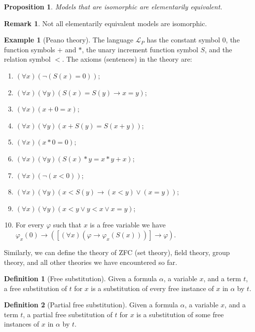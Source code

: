 \documentclass[11pt,a4paper]{article}
\theoremstyle{definition}
\newtheorem{definition}{Definition}[section]
\newtheorem{remark}{Remark}[section]
\newtheorem{example}{Example}[section]
\theoremstyle{plain}
\newtheorem{proposition}[theorem]{Proposition}
\renewcommand{\L}{\mathcal{L}}
\renewcommand{\implies}{\rightarrow}
\begin{document}
  \begin{proposition}
    Models that are isomorphic are elementarily equivalent.
  \end{proposition}
  \begin{remark}
    Not all elementarily equivalent models are isomorphic.
  \end{remark}

  \begin{example}[Peano theory]
    The language $\L_P$ has the constant symbol $0$, the function symbols
    $+$ and $*$, the unary increment function symbol $S$, and the relation
    symbol $<$. The axioms (sentences) in the theory are:
    \begin{enumerate}
      \item [(1)] $(\forall x)(\neg (S(x) = 0))$;
      \item [(2)] $(\forall x)(\forall y)(S(x) = S(y) \implies x =y)$;
      \item [(3)] $(\forall x)(x + 0 = x)$;
      \item [(4)] $(\forall x)(\forall y)(x + S(y) = S(x + y))$;
      \item [(5)] $(\forall x)(x * 0 = 0)$;
      \item [(6)] $(\forall x)(\forall y)(S(x) * y = x * y + x)$;
      \item [(7)] $(\forall x)(\neg (x < 0))$;
      \item [(8)] $(\forall x)(\forall y)
        (x < S(y) \implies (x < y) \lor (x=y))$;
      \item [(9)] $(\forall x)(\forall y)(x < y \lor y < x \lor x = y)$;
      \item [(10)] For every $\varphi$ such that $x$ is a free variable 
        we have $\varphi_x(0) \implies \left(\left[(\forall x)
        (\varphi \implies \varphi_x(S(x)))\right] \implies \varphi \right)$.
    \end{enumerate}
  \end{example}

  Similarly, we can define the theory of ZFC (set theory), field theory,
  group theory, and all other theories we have encountered so far.

  \begin{definition}[Free substitution]
    Given a formula $\alpha$, a variable $x$, and a term $t$,
    a free substitution of $t$ for $x$ is a substitution of every
    free instance of $x$ in $\alpha$ by $t$.
  \end{definition}

  \begin{definition}[Partial free substitution]
    Given a formula $\alpha$, a variable $x$, and a term $t$,
    a partial free substitution of $t$ for $x$ is a substitution of some
    free instances of $x$ in $\alpha$ by $t$.
  \end{definition}
\end{document}
